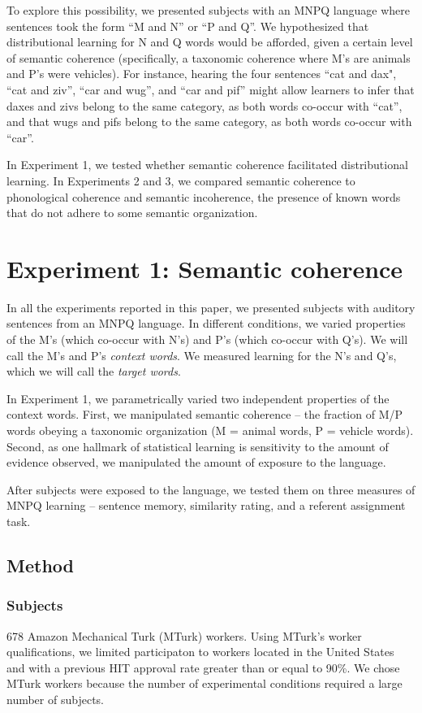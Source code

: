 \documentclass[man,floatsintext]{apa6}
\begin{document}
To explore this possibility, we presented subjects with an MNPQ language where sentences took the form ``M and N'' or ``P and Q''. We hypothesized that distributional learning for N and Q words would be afforded, given a certain level of semantic coherence (specifically, a taxonomic coherence where M's are animals and P's were vehicles). For instance, hearing the four sentences ``cat and dax", ``cat and ziv'', ``car and wug'', and ``car and pif'' might allow learners to infer that daxes and zivs belong to the same category, as both words co-occur with ``cat'', and that wugs and pifs belong to the same category, as both words co-occur with ``car''.

In Experiment 1, we tested whether semantic coherence facilitated distributional learning. In Experiments 2 and 3, we compared semantic coherence to phonological coherence and semantic incoherence, the presence of known words that do not adhere to some semantic organization.

\section{Experiment 1: Semantic coherence}

In all the experiments reported in this paper, we presented subjects with auditory sentences from an MNPQ language. In different conditions, we varied properties of the M's (which co-occur with N's) and P's (which co-occur with Q's). We will call the M's and P's \emph{context words}. We measured learning for the N's and Q's, which we will call the \emph{target words}.

In Experiment 1, we parametrically varied two independent properties of the context words. First, we manipulated semantic coherence -- the fraction of M/P words obeying a taxonomic organization (M = animal words, P = vehicle words). Second, as one hallmark of statistical learning is sensitivity to the amount of evidence observed, we manipulated the amount of exposure to the language.

After subjects were exposed to the language, we tested them on three measures of MNPQ learning -- sentence memory, similarity rating, and a referent assignment task.

\subsection{Method}

\subsubsection{Subjects}
678 Amazon Mechanical Turk (MTurk) workers. Using MTurk's worker qualifications, we limited participaton to workers located in the United States and with a previous HIT approval rate greater than or equal to 90\%. We chose MTurk workers because the number of experimental conditions required a large number of subjects.
\end{document}

